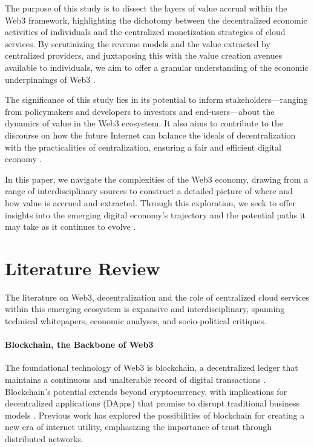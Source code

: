 \documentclass{article}
\begin{document}
The purpose of this study is to dissect the layers of value accrual within the Web3 framework, highlighting the dichotomy between the decentralized economic activities of individuals and the centralized monetization strategies of cloud services. By scrutinizing the revenue models and the value extracted by centralized providers, and juxtaposing this with the value creation avenues available to individuals, we aim to offer a granular understanding of the economic underpinnings of Web3 \cite{weylohmmaxwell2018}.

The significance of this study lies in its potential to inform stakeholders—ranging from policymakers and developers to investors and end-users—about the dynamics of value in the Web3 ecosystem. It also aims to contribute to the discourse on how the future Internet can balance the ideals of decentralization with the practicalities of centralization, ensuring a fair and efficient digital economy \cite{buterin2014ethereum}.

In this paper, we navigate the complexities of the Web3 economy, drawing from a range of interdisciplinary sources to construct a detailed picture of where and how value is accrued and extracted. Through this exploration, we seek to offer insights into the emerging digital economy's trajectory and the potential paths it may take as it continues to evolve \cite{narayananetal2016}.

\section{Literature Review}
The literature on Web3, decentralization and the role of centralized cloud services within this emerging ecosystem is expansive and interdisciplinary, spanning technical whitepapers, economic analyses, and socio-political critiques.

\paragraph{Blockchain, the Backbone of Web3}  The foundational technology of Web3 is blockchain, a decentralized ledger that maintains a continuous and unalterable record of digital transactions \cite{nakamoto2008bitcoin}. Blockchain's potential extends beyond cryptocurrency, with implications for decentralized applications (DApps) that promise to disrupt traditional business models \cite{christidis2016blockchains}. Previous work has \cite{tapscott2016blockchain} explored the possibilities of blockchain for creating a new era of internet utility, emphasizing the importance of trust through distributed networks.
\end{document}
